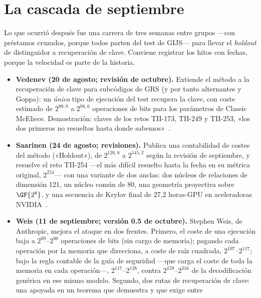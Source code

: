 \section{La cascada de septiembre}\label{sec:2026-cascada}

Lo que ocurrió después fue una carrera de tres semanas entre grupos
---con préstamos cruzados, porque todos parten del test de GIJS---
para llevar el \emph{holdout} de distinguidor a recuperación de
clave. Conviene registrar los hitos con fechas, porque la velocidad
es parte de la historia.

\begin{itemize}[leftmargin=1.5em,itemsep=3pt]
  \item \textbf{Vedenev (20 de agosto; revisión de octubre).} Extiende
        el método a la recuperación de clave para subcódigos de
        GRS (y por tanto alternantes y Goppa): un \emph{único} tipo
        de ejecución del test recupera la clave, con coste estimado
        de $2^{89{,}9}$ a $2^{98{,}6}$ operaciones de bits para los
        parámetros de Classic McEliece. Demostración: claves de los
        retos TII-173, TII-249 y TII-253, «los dos primeros no
        resueltos hasta donde sabemos»~\cite{vedenev2026}.
  \item \textbf{Saarinen (24 de agosto; revisiones).} Publica una
        contabilidad de costes del método («Holdout»), de $2^{126{,}8}$
        a $2^{145{,}2}$ según la revisión de septiembre, y resuelve
        el reto TII-254 ---el más difícil resuelto hasta la fecha
        en su métrica original, $2^{254}$--- con una variante de dos
        anclas: dos núcleos de relaciones de dimensión 121, un
        núcleo común de 80, una geometría proyectiva sobre
        $\GF{2^8}$, y una secuencia de Krylov final de 27{,}2
        horas-GPU en aceleradoras NVIDIA~\cite{saarinen2026a,saarinen2026b}.
  \item \textbf{Weis (11 de septiembre; versión 0.5 de octubre).}
        Stephen Weis, de Anthropic, mejora el ataque en dos frentes.
        Primero, el coste de una ejecución baja a $2^{89}$--$2^{98}$
        operaciones de bits (sin cargo de memoria); pagando cada
        operación por la memoria que direcciona, a coste de raíz
        cuadrada, $2^{107}$--$2^{117}$; bajo la regla contable de la
        guía de seguridad ---que carga el coste de toda la memoria
        en cada operación---, $2^{117}$--$2^{128}$, contra
        $2^{159}$--$2^{316}$ de la decodificación genérica en ese
        mismo modelo. Segundo, dos rutas de recuperación de clave:
        una apoyada en un teorema que demuestra y que exige entre

\end{itemize}
